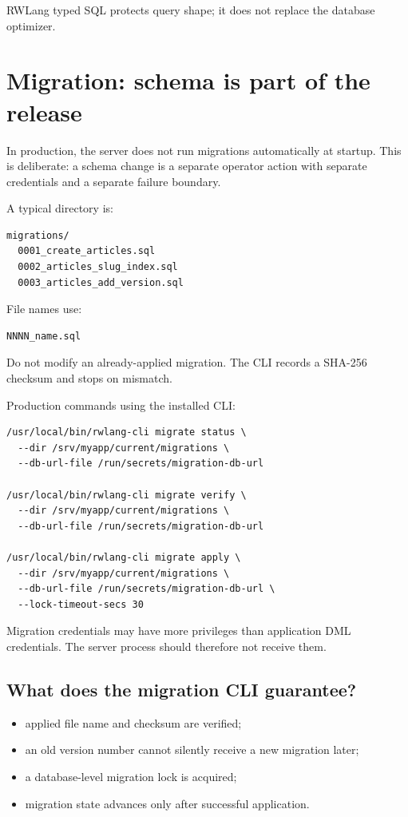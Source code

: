 RWLang typed SQL protects query shape; it does not replace the database optimizer.

\section{Migration: schema is part of the release}

In production, the server does not run migrations automatically at startup. This is deliberate: a schema change is a separate operator action with separate credentials and a separate failure boundary.

A typical directory is:

\begin{lstlisting}
migrations/
  0001_create_articles.sql
  0002_articles_slug_index.sql
  0003_articles_add_version.sql
\end{lstlisting}

File names use:

\begin{lstlisting}
NNNN_name.sql
\end{lstlisting}

Do not modify an already-applied migration. The CLI records a SHA-256 checksum and stops on mismatch.

Production commands using the installed CLI:

\begin{lstlisting}
/usr/local/bin/rwlang-cli migrate status \
  --dir /srv/myapp/current/migrations \
  --db-url-file /run/secrets/migration-db-url

/usr/local/bin/rwlang-cli migrate verify \
  --dir /srv/myapp/current/migrations \
  --db-url-file /run/secrets/migration-db-url

/usr/local/bin/rwlang-cli migrate apply \
  --dir /srv/myapp/current/migrations \
  --db-url-file /run/secrets/migration-db-url \
  --lock-timeout-secs 30
\end{lstlisting}

Migration credentials may have more privileges than application DML credentials. The server process should therefore not receive them.

\subsection*{What does the migration CLI guarantee?}

\begin{itemize}
\item applied file name and checksum are verified;
\item an old version number cannot silently receive a new migration later;
\item a database-level migration lock is acquired;
\item migration state advances only after successful application.
\end{itemize}

